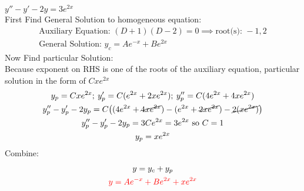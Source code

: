 \item [7.] $y''-y'-2y=3e^{2x}$\\[2mm]
First Find General Solution to homogeneous equation:
\begin{gather*}
    \text{Auxiliary Equation: } (D+1)(D-2)=0 \implies \text{root(s): } -1,2\\
    \text{General Solution: } y_c=Ae^{-x}+Be^{2x}
\end{gather*}
Now Find particular Solution:\\
Because exponent on RHS is one of the roots of the auxiliary equation, particular solution in the form of $Cxe^{2x}$
\begin{gather*}
    y_p=Cxe^{2x};\:y_p'=C(e^{2x}+2xe^{2x});\:y_p''=C(4e^{2x}+4xe^{2x})\\
    y_p''-y_p'-2y_p=C\big((4e^{2x}+\cancel{4xe^{2x}})-(e^{2x}+\cancel{2xe^{2x}})-\cancel{2(xe^{2x})}\big)\\
    y_p''-y_p'-2y_p=3Ce^{2x} = 3e^{2x} \text{ so } C=1\\
    y_p = xe^{2x}
\end{gather*}
Combine:
\begin{gather*}
    y=y_c+y_p\\
    \textcolor{red}{y = Ae^{-x}+Be^{2x}+xe^{2x}}
\end{gather*}